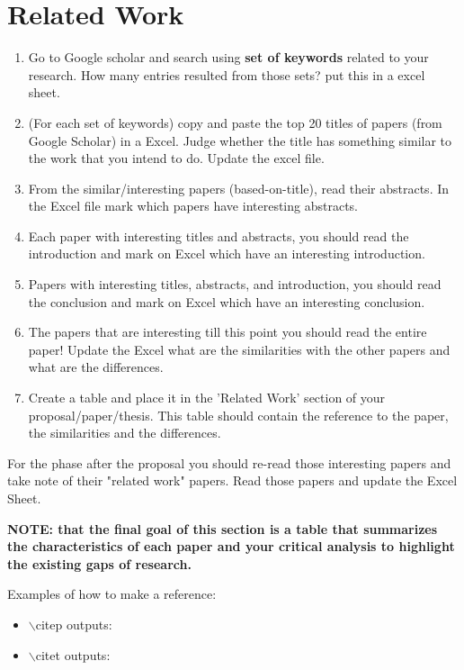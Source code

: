 \section{Related Work}

\begin{enumerate}
\item Go to Google scholar and search using \textbf{set of keywords} related to your research. How many entries resulted from those sets? put this in a excel sheet.
\item (For each set of keywords) copy and paste the top 20 titles of papers (from Google Scholar) in a Excel. Judge whether the title has something similar to the work that you intend to do. Update the excel file.
\item From the similar/interesting papers (based-on-title), read their abstracts. In the Excel file mark which papers have interesting abstracts. 
\item Each paper with interesting titles and abstracts, you should read the introduction and mark on Excel which have an interesting introduction.
\item Papers with interesting titles, abstracts, and introduction, you should read the conclusion and mark on Excel which have an interesting conclusion.
\item The papers that are interesting till this point you should read the entire paper! Update the Excel what are the similarities with the other papers and what are the differences.
\item Create a table and place it in the 'Related Work' section of your proposal/paper/thesis. This table should contain the reference to the paper, the similarities and the differences. 
\end{enumerate}

For the phase after the proposal you should re-read those interesting papers and take note of their "related work" papers. Read those papers and update the Excel Sheet.

\textbf{NOTE: that the final goal of this section is a table that summarizes the characteristics of each paper and your critical analysis to highlight the existing gaps of research.}

Examples of how to make a reference:
\begin{itemize}
	\item $\backslash$citep outputs: \citep{jjsantanna2015IM1}
	\item $\backslash$citet outputs: \citet{jjsantanna2015IM1}

\end{itemize}
